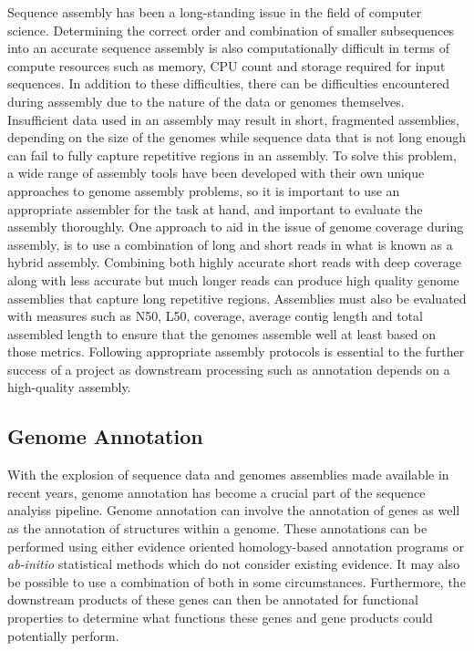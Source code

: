\documentclass[12pt]{article}
\begin{document}
Sequence assembly has been a long-standing issue in the field of
computer science\cite{assembly}. Determining the correct order and
combination of smaller subsequences into an accurate sequence assembly
is also computationally difficult in terms of compute resources such
as memory, CPU count and storage required for input
sequences\cite{assembly}. In addition to these difficulties, there can
be difficulties encountered during asssembly due to the nature of the
data or genomes themselves. Insufficient data used in an assembly may
result in short, fragmented assemblies, depending on the size of the
genomes while sequence data that is not long enough can fail to fully
capture repetitive regions in an assembly. To solve this problem, a
wide range of assembly tools have been developed with their own unique
approaches to genome assembly problems, so it is important to use an
appropriate assembler for the task at hand, and important to evaluate
the assembly thoroughly. One approach to aid in the issue of genome
coverage during assembly, is to use a combination of long and short
reads in what is known as a hybrid assembly. Combining both highly
accurate short reads with deep coverage along with less accurate but
much longer reads can produce high quality genome assemblies that
capture long repetitive regions. Assemblies must also be evaluated
with measures such as N50, L50, coverage, average contig length and
total assembled length to ensure that the genomes assemble well at
least based on those metrics\cite{assembly}. Following appropriate
assembly protocols is essential to the further success of a project as
downstream processing such as annotation depends on a high-quality
assembly.

\subsection{Genome Annotation}
With the explosion of sequence data and genomes assemblies made
available in recent years, genome annotation has become a crucial part
of the sequence analyiss pipeline. Genome annotation can involve the
annotation of genes as well as the annotation of structures within a
genome. These annotations can be performed using either evidence
oriented homology-based annotation programs or \textit{ab-initio}
statistical methods which do not consider existing
evidence\cite{AnnotationSummary}. It may also be possible to use a
combination of both in some circumstances. Furthermore, the downstream
products of these genes can then be annotated for functional
properties to determine what functions these genes and gene products
could potentially perform.
\end{document}
